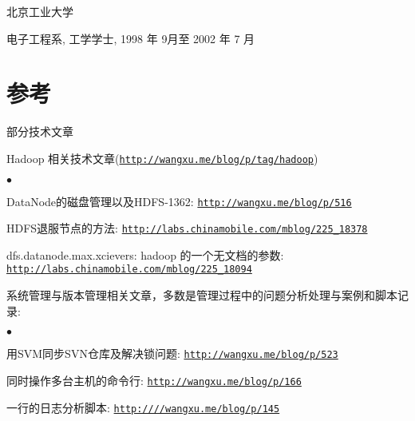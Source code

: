 \documentclass[margin,line]{res}
\newenvironment{list1}{
  \begin{list}{\ding{113}}{%
      \setlength{\itemsep}{0in}
      \setlength{\parsep}{0in} \setlength{\parskip}{0in}
      \setlength{\topsep}{0in} \setlength{\partopsep}{0in} 
      \setlength{\leftmargin}{0.17in}}}{\end{list}}
\newenvironment{list2}{
  \begin{list}{$\bullet$}{%
      \setlength{\itemsep}{0in}
      \setlength{\parsep}{0in} \setlength{\parskip}{0in}
      \setlength{\topsep}{0in} \setlength{\partopsep}{0in} 
      \setlength{\leftmargin}{0.2in}}}{\end{list}}
\newcommand{\http}{http:/\hspace{-0.3ex}/}
\newcommand{\hindent}{\mbox{\hspace{8ex}}}
\begin{document}
\begin{resume}
\textsf{北京工业大学}\\
\vspace*{-.1in}
\begin{list1}
\item[] 电子工程系, 工学学士, 1998 年 9月至 2002 年 7 月 
\end{list1}

\section{参考}
\textsf{部分技术文章}\\
\vspace*{-.1in}
\begin{list1}
\item[] Hadoop 相关技术文章(\href{http://wangxu.me/blog/p/tag/hadoop}{\tt\http{}wangxu.me/blog/p/tag/hadoop})
\begin{list2}
\vspace*{.05in}
\item DataNode的磁盘管理以及HDFS-1362: \href{http://wangxu.me/blog/p/516}{\tt\http{}wangxu.me/blog/p/516}
\item HDFS退服节点的方法: \href{http://labs.chinamobile.com/mblog/225_18378}{\tt\http{}labs.chinamobile.com/mblog/225\_18378}
\item dfs.datanode.max.xcievers: hadoop 的一个无文档的参数: \\
	\hindent\href{http://labs.chinamobile.com/mblog/225_18094}{\tt\http{}labs.chinamobile.com/mblog/225\_18094}
\vspace*{.05in}
\end{list2}
\item[] 系统管理与版本管理相关文章，多数是管理过程中的问题分析处理与案例和脚本记录:
\begin{list2}
\vspace*{.05in}
\item 用SVM同步SVN仓库及解决锁问题: \href{http://wangxu.me/blog/p/523}{\tt\http{}wangxu.me/blog/p/523}
\item 同时操作多台主机的命令行: \href{http://wangxu.me/blog/p/166}{\tt\http{}wangxu.me/blog/p/166}
\item 一行的日志分析脚本: \href{http://wangxu.me/blog/p/145}{\tt\http{}//wangxu.me/blog/p/145}
\vspace*{.05in}
\end{list2}
\end{list1}


\end{resume}
\end{document}
